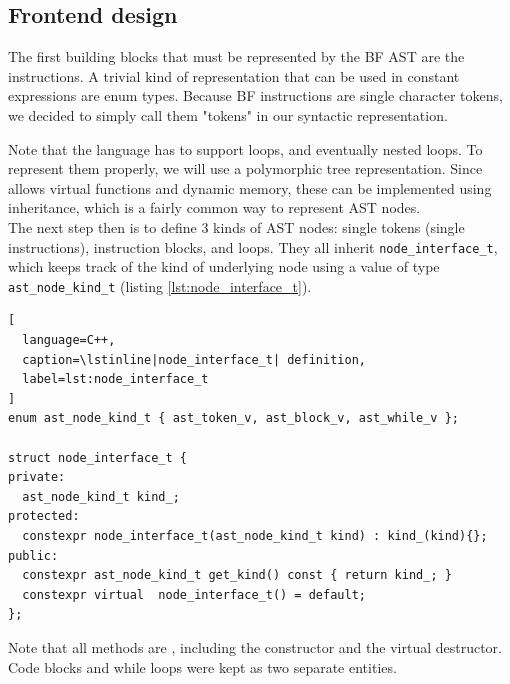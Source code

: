 \documentclass[../../main.tex]{subfiles}
\begin{document}

\subsection{Frontend design}

The first building blocks that must be represented by the BF AST are the
instructions. A trivial kind of representation that can be used in constant
expressions are enum types. Because BF instructions are single character tokens,
we decided to simply call them "tokens" in our syntactic representation.



Note that the language has to support loops, and eventually nested loops.
To represent them properly, we will use a polymorphic tree representation.
Since  allows virtual functions and dynamic memory, these can be
implemented using inheritance, which is a fairly common way to represent AST
nodes.\\

The next step then is to define 3 kinds of AST nodes: single tokens (\ie single
instructions), instruction blocks, and loops. They all inherit
\lstinline|node_interface_t|, which keeps track of the kind of underlying node
using a value of type \lstinline|ast_node_kind_t|
(listing \ref{lst:node_interface_t}).

\begin{lstlisting}[
  language=C++,
  caption=\lstinline|node_interface_t| definition,
  label=lst:node_interface_t
]
enum ast_node_kind_t { ast_token_v, ast_block_v, ast_while_v };

struct node_interface_t {
private:
  ast_node_kind_t kind_;
protected:
  constexpr node_interface_t(ast_node_kind_t kind) : kind_(kind){};
public:
  constexpr ast_node_kind_t get_kind() const { return kind_; }
  constexpr virtual  node_interface_t() = default;
};
\end{lstlisting}

% 

Note that all methods are \constexpr, including the constructor and the virtual
destructor. Code blocks and while loops were kept as two separate entities.
\end{document}
